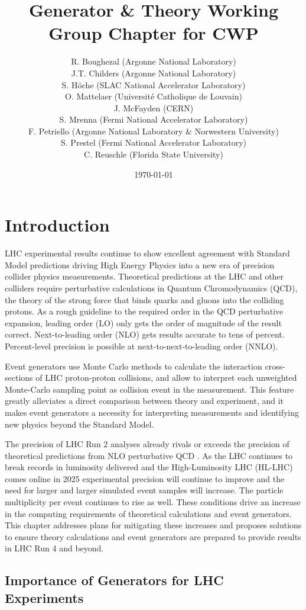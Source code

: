\documentclass{article}
\title{Generator \& Theory Working Group Chapter for CWP}
\author{
R. Boughezal (Argonne National Laboratory) \\ 
J.T. Childers (Argonne National Laboratory) \\
S. H{\"o}che (SLAC National Accelerator Laboratory) \\
O. Mattelaer (Universit\'e Catholique de Louvain) \\
J. McFayden (CERN)\\
S. Mrenna (Fermi National Accelerator Laboratory)\\
F. Petriello (Argonne National Laboratory \& Norwestern University)\\
S. Prestel (Fermi National Accelerator Laboratory)\\
C. Reuschle (Florida State University)}
\date{\today}
\begin{document}
\maketitle

\section{Introduction}

LHC experimental results continue to show excellent agreement with Standard Model predictions driving High Energy Physics into a new era of precision collider physics measurements. Theoretical predictions at the LHC and other colliders require perturbative calculations in Quantum Chromodynamics (QCD), the theory of the strong force that binds quarks and gluons into the colliding protons.  As a rough guideline to the required order in the QCD perturbative expansion, leading order (LO) only gets the order of magnitude of the result correct.  Next-to-leading order (NLO) gets results accurate to tens of percent.  Percent-level precision is possible at next-to-next-to-leading order (NNLO).  

Event generators use Monte Carlo methods to calculate the interaction cross-sections of LHC proton-proton collisions, and allow to interpret each unweighted Monte-Carlo sampling point as collision event in the measurement. This feature greatly alleviates a direct comparison between theory and experiment, and it makes event generators a necessity for interpreting measurements and identifying new physics beyond the Standard Model. 

The precision of LHC Run 2 analyses already rivals or exceeds the precision of theoretical predictions from NLO perturbative QCD \cite{AtlasZxs2017,AtlasWZxs2017}. As the LHC continues to break records in luminosity delivered and the High-Luminosity LHC (HL-LHC) comes online in 2025 experimental precision will continue to improve and the need for larger and larger simulated event samples will increase. The particle multiplicity per event continues to rise as well. These conditions drive an increase in the computing requirements of theoretical calculations and event generators. This chapter addresses plans for mitigating these increases and proposes solutions to ensure theory calculations and event generators are prepared to provide results in LHC Run 4 and beyond.

\subsection{Importance of Generators for LHC Experiments}
\end{document}
